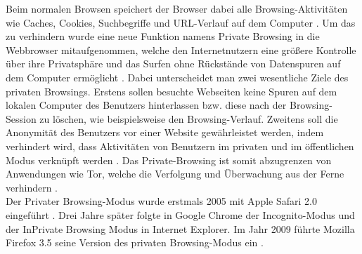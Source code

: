 Beim \glqq{}normalen\grqq{} Browsen speichert der Browser dabei alle Browsing-Aktivitäten wie Caches, Cookies, Suchbegriffe und URL-Verlauf auf dem Computer \cite{Izzati.2022}. Um das zu verhindern wurde eine neue Funktion namens \glqq{}Private Browsing\grqq{} in die Webbrowser mitaufgenommen, welche den Internetnutzern eine größere Kontrolle über ihre Privatsphäre und das Surfen ohne Rückstände von Datenspuren auf dem Computer ermöglicht \cite{Said.2011}. Dabei unterscheidet man zwei wesentliche Ziele des privaten Browsings. Erstens sollen besuchte Webseiten keine Spuren auf dem lokalen Computer des Benutzers hinterlassen bzw. diese nach der Browsing-Session zu löschen, wie beispielsweise den Browsing-Verlauf. Zweitens soll die Anonymität des Benutzers vor einer Website gewährleistet werden, indem verhindert wird, dass Aktivitäten von Benutzern im privaten und im öffentlichen Modus verknüpft werden \cite{Aggarwal.2010,Montasari.2015}. Das Private-Browsing ist somit abzugrenzen von Anwendungen wie Tor, welche die Verfolgung und Überwachung aus der Ferne verhindern \cite{Horsman.2019}.\\
Der \glqq{}Privater Browsing-Modus\grqq{} wurde erstmals 2005 mit Apple Safari 2.0 eingeführt \cite{Said.2011}. Drei Jahre später folgte in Google Chrome der \glqq{}Incognito-Modus\grqq{} und der \glqq{}InPrivate Browsing Modus\grqq{} in Internet Explorer. Im Jahr 2009 führte Mozilla Firefox 3.5 seine Version des privaten Browsing-Modus ein \cite{Montasari.2015}.\\
